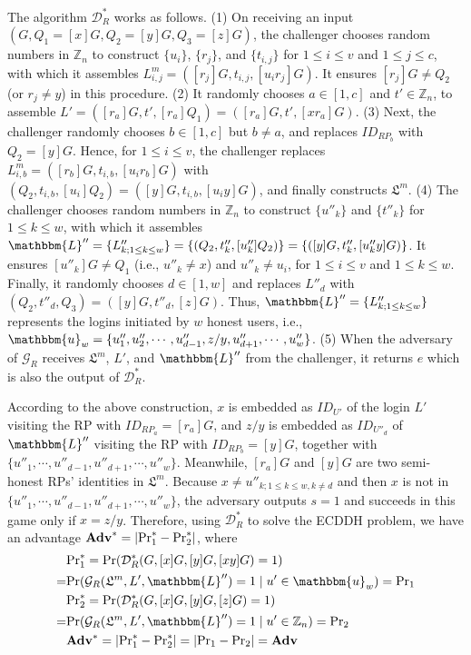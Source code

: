 The algorithm $\mathcal{D}^*_R$ works as follows. (1) On receiving an input $(G, Q_1=[x]G, Q_2=[y]G, Q_3=[z]G)$,
the challenger
chooses random numbers in $\mathbb{Z}_n$ to construct $\{u_i\}$, $\{r_j\}$, and $\{t_{i, j}\}$ for $1 \le i \le v$ and $1 \le j \le c$, with which it assembles $L^m_{i, j}=([r_j]G, t_{i,j}, [u_ir_j]G)$.
It ensures $[r_{j}]G \neq Q_2$ (or $r_j \neq y$) in this procedure.
(2) It randomly chooses $a \in [1, c]$ and $t' \in \mathbb{Z}_n$, to assemble $L' = ([r_{a}]G, t', [r_{a}]Q_1) = ([r_{a}]G, t', [xr_{a}]G)$.
(3)
Next, the challenger randomly chooses $b \in [1, c]$ but $b \neq a$, and replaces $ID_{RP_b}$ with $Q_2 = [y]G$.
Hence, for $1 \le i \le v$, the challenger replaces $L^m_{i, b}=([r_b]G, t_{i,b}, [u_ir_b]G)$ with $(Q_2, t_{i,b}, [u_i]Q_2) = ([y]G, t_{i,b}, [u_iy]G)$, and finally constructs $\mathfrak{L}^m$.
(4) The challenger chooses random numbers in $\mathbb{Z}_n$ to construct $\{u''_k\}$ and $\{t''_k\}$ for $1 \leq k \leq w$,
 with which it assembles $\mathbbm{L}'' = \{L''_{k; 1\leq k \leq w}\} = \{(Q_2, t''_k, [u''_k]Q_2)\} = \{([y]G, t''_k, [u''_ky]G)\}$.
It ensures $[u''_k]G \neq Q_1$ (i.e., $u''_k \neq x$) and $u''_k \neq u_i$,
 for $1 \le i \le v$ and $1 \le k \le w$.
Finally, it randomly chooses $d \in [1, w]$ and replaces $L''_{d}$ with $(Q_2, t''_d, Q_3) = ([y]G, t''_d, [z]G)$.
 Thus, $\mathbbm{L}'' = \{L''_{k;1\leq k \leq w}\}$ represents the logins initiated by $w$ honest users, i.e., $\mathbbm{u}_w=\{u''_1, u''_2, \cdots, u''_{d-1}, z/y, u''_{d+1}, \cdots, u''_w\}$.
 (5) When the adversary of $\mathcal{G}_R$ receives $\mathfrak{L}^m$, $L'$, and $\mathbbm{L}''$ from the challenger, it returns $e$ which is also the output of $\mathcal{D}^*_R$.

According to the above construction, %
$x$ is embedded as $ID_{U'}$ of the login $L'$ visiting the RP with $ID_{RP_{a}} = [r_{a}]G$,
and $z/y$ is embedded as $ID_{U''_d}$ of $\mathbbm{L}''$ visiting the RP with $ID_{RP_{b}}=[y]G$,
together with $\{u''_1, \cdots, u''_{d-1}, u''_{d+1}, \cdots, u''_w\}$.
Meanwhile, $[r_{a}]G$ and $[y]G$ are two semi-honest RPs' identities in $\mathfrak{L}^m$.
Because $x \neq u''_{k; 1\leq k \leq w, k \neq d}$ and then $x$ is not in $\{u''_1, \cdots, u''_{d-1}, u''_{d+1}, \cdots, u''_w\}$, the adversary outputs $s=1$ and succeeds in this game only if $x = z/y$.
Therefore, using $\mathcal{D}^*_R$ to solve the ECDDH problem, we have an advantage $\mathbf{Adv}^*=|{\rm Pr}^*_1 - {\rm Pr}^*_2|$, where
\begin{align*}
&{\rm Pr}^*_1 =  {\rm Pr}(\mathcal{D}^*_R(G, [x]G, [y]G, [xy]G)=1) \\
=&{\rm Pr}(\mathcal{G}_R(\mathfrak{L}^m, L', \mathbbm{L}'')=1 \; | \; u' \in \mathbbm{u}_w) = {\rm Pr}_1 \\
&{\rm Pr}^*_2= {\rm Pr}(\mathcal{D}^*_R(G, [x]G, [y]G, [z]G)=1) \\
=&{\rm Pr}(\mathcal{G}_R(\mathfrak{L}^m, L', \mathbbm{L}'')=1 \; | \; u' \in \mathbb{Z}_n) = {\rm Pr}_2 \\
&\mathbf{Adv}^*=|{\rm Pr}^*_1-{\rm Pr}^*_2|=|{\rm Pr}_1-{\rm Pr}_2|={\mathbf{Adv}}
\end{align*}

